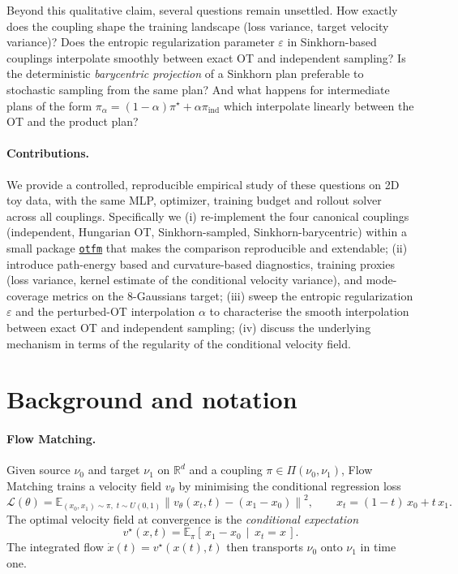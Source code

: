 \documentclass[11pt,a4paper]{article}
\newcommand{\R}{\mathbb{R}}
\newcommand{\E}{\mathbb{E}}
\begin{document}
Beyond this qualitative claim, several questions remain unsettled.  How exactly
does the coupling shape the training landscape (loss variance, target velocity
variance)?  Does the entropic regularization parameter $\varepsilon$ in
Sinkhorn-based couplings interpolate smoothly between exact OT and independent
sampling?  Is the deterministic \emph{barycentric projection} of a Sinkhorn plan
preferable to stochastic sampling from the same plan?  And what happens for
intermediate plans of the form
$\pi_\alpha = (1-\alpha)\pi^\star + \alpha\pi_{\mathrm{ind}}$ which interpolate
linearly between the OT and the product plan?

\paragraph{Contributions.}
We provide a controlled, reproducible empirical study of these questions on 2D
toy data, with the same MLP, optimizer, training budget and rollout solver
across all couplings.  Specifically we (i) re-implement the four canonical
couplings (independent, Hungarian OT, Sinkhorn-sampled, Sinkhorn-barycentric)
within a small package
\href{https://github.com/dettorig/ot_flow_matching_project}{\texttt{otfm}} that
makes the comparison reproducible and extendable;  (ii) introduce path-energy
based and curvature-based diagnostics, training proxies (loss variance, kernel
estimate of the conditional velocity variance), and mode-coverage metrics on the
8-Gaussians target;  (iii) sweep the entropic regularization $\varepsilon$ and
the perturbed-OT interpolation $\alpha$ to characterise the smooth interpolation
between exact OT and independent sampling;  (iv) discuss the underlying
mechanism in terms of the regularity of the conditional velocity field.

\section{Background and notation}
\label{sec:background}

\paragraph{Flow Matching.}
Given source $\nu_0$ and target $\nu_1$ on $\R^d$ and a coupling $\pi \in
\Pi(\nu_0, \nu_1)$, Flow Matching trains a velocity field $v_\theta$ by
minimising the conditional regression loss
\begin{equation}
    \label{eq:fm-loss}
    \mathcal{L}(\theta)
    = \E_{(x_0, x_1) \sim \pi,\; t \sim U(0,1)}
        \left\| v_\theta(x_t, t) - (x_1 - x_0) \right\|^2,
    \qquad
    x_t = (1-t)\,x_0 + t\,x_1.
\end{equation}
The optimal velocity field at convergence is the \emph{conditional expectation}
\begin{equation}
    v^\star(x, t) = \E_\pi[\, x_1 - x_0 \,\mid\, x_t = x\,].
\end{equation}
The integrated flow $\dot{x}(t) = v^\star(x(t), t)$ then transports $\nu_0$ onto
$\nu_1$ in time one.
\end{document}
